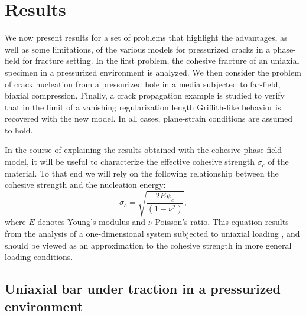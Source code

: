 \section{Results}
\label{sec:results}

We now present results for a set of problems that highlight the advantages, as well as some limitations, of the various models for pressurized cracks in a phase-field for fracture setting. In the first problem, the cohesive fracture of an uniaxial specimen in a pressurized environment is analyzed. We then consider the problem of crack nucleation from a pressurized hole in a media subjected to far-field, biaxial compression.  
Finally, a crack propagation example is studied to verify that in the limit of a vanishing regularization length Griffith-like behavior is recovered with the new model.  In all cases, plane-strain conditions are assumed to hold.  

In the course of explaining the results obtained with the cohesive phase-field model, it will be useful to characterize the effective cohesive strength $\sigma_c$ of the material.  To that end we will rely on the following relationship between the cohesive strength and the nucleation energy:
\begin{equation}
  \label{eq:sigmacrit-from-psicrit}
   \sigma_c = \sqrt{ \dfrac{2E \psi_c }{(1-\nu^2)} },
\end{equation}
where $E$ denotes Young's modulus and $\nu$ Poisson's ratio.  This equation results from the analysis of a one-dimensional system subjected to uniaxial loading \cite{geelen2019phase}, and should be viewed as an approximation to the cohesive strength in more general loading conditions.  


\subsection{Uniaxial bar under traction in a pressurized environment}

